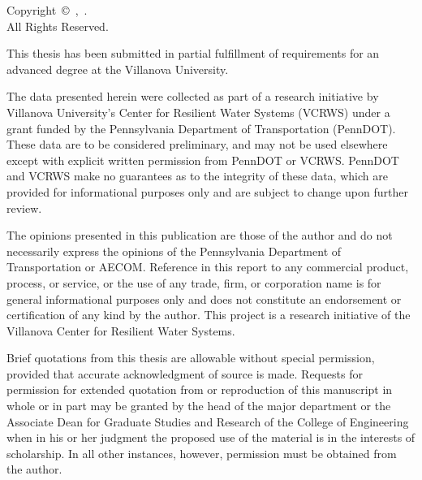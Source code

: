 %

\vspace*{\fill}
\begin{center}
	Copyright~\copyright~\thesisDate,~\thesisName. \\ All Rights Reserved.
\end{center}
\vspace*{\fill}

\pagebreak


This thesis has been submitted in partial fulfillment of requirements for an advanced degree at the Villanova University.

The data presented herein were collected as part of a research initiative by Villanova University's Center for Resilient Water Systems (VCRWS) under a grant funded by the Pennsylvania Department of Transportation (PennDOT). These data are to be considered preliminary, and may not be used elsewhere except with explicit written permission from PennDOT or VCRWS. PennDOT and VCRWS make no guarantees as to the integrity of these data, which are provided for informational purposes only and are subject to change upon further review.

The opinions presented in this publication are those of the author and do not necessarily express the opinions of the Pennsylvania Department of Transportation or AECOM. Reference in this report to any commercial product, process, or service, or the use of any trade, firm, or corporation name is for general informational purposes only and does not constitute an endorsement or certification of any kind by the author. This project is a research initiative of the Villanova Center for Resilient Water Systems.

Brief quotations from this thesis are allowable without special permission, provided that accurate acknowledgment of source is made. Requests for permission for extended quotation from or reproduction of this manuscript in whole or in part may be granted by the head of the major department or the Associate Dean for Graduate Studies and Research of the College of Engineering when in his or her judgment the proposed use of the material is in the interests of scholarship. In all other instances, however, permission must be obtained from the author.

\label{sec:acknowledgement}

